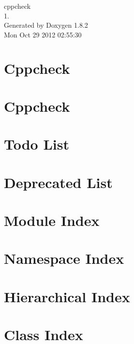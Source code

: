 \documentclass{book}
\begin{document}
\hypersetup{pageanchor=false,citecolor=blue}
\begin{titlepage}
\vspace*{7cm}
\begin{center}
{\Large cppcheck \\[1ex]\large 1. }\\
\vspace*{1cm}
{\large Generated by Doxygen 1.8.2}\\
\vspace*{0.5cm}
{\small Mon Oct 29 2012 02:55:30}\\
\end{center}
\end{titlepage}
\clearemptydoublepage
{}
\tableofcontents
\clearemptydoublepage
{}
\hypersetup{pageanchor=true,citecolor=blue}
\chapter{Cppcheck}
\label{index}\hypertarget{index}{}
\chapter{Cppcheck}
\label{md_readme}
\hypertarget{md_readme}{}

\chapter{Todo List}
\label{todo}
\hypertarget{todo}{}

\chapter{Deprecated List}
\label{deprecated}
\hypertarget{deprecated}{}

\chapter{Module Index}

\chapter{Namespace Index}

\chapter{Hierarchical Index}

\chapter{Class Index}

\end{document}
